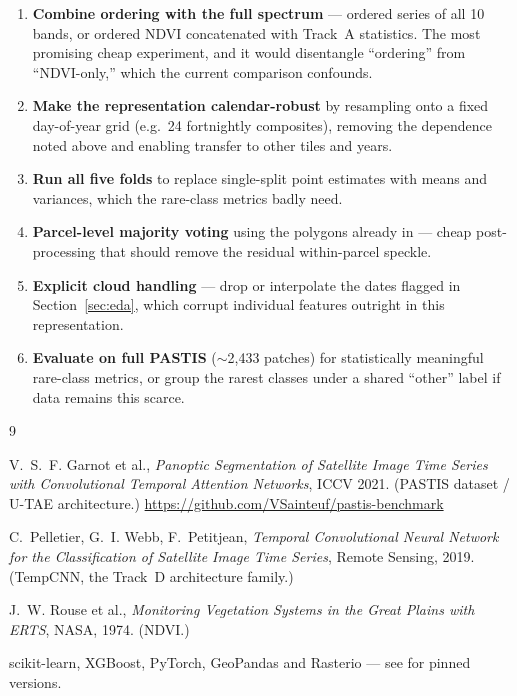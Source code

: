 \documentclass[11pt,a4paper]{article}
\newcommand{\file}[1]{\texttt{\detokenize{#1}}}
\begin{document}
\begin{enumerate}[leftmargin=*]
  \item \textbf{Combine ordering with the full spectrum} --- ordered series of
        all 10 bands, or ordered NDVI concatenated with Track~A statistics. The
        most promising cheap experiment, and it would disentangle ``ordering''
        from ``NDVI-only,'' which the current comparison confounds.
  \item \textbf{Make the representation calendar-robust} by resampling onto a
        fixed day-of-year grid (e.g.\ 24 fortnightly composites), removing the
        dependence noted above and enabling transfer to other tiles and years.
  \item \textbf{Run all five folds} to replace single-split point estimates with
        means and variances, which the rare-class metrics badly need.
  \item \textbf{Parcel-level majority voting} using the polygons already in
        \file{metadata.geojson} --- cheap post-processing that should remove the
        residual within-parcel speckle.
  \item \textbf{Explicit cloud handling} --- drop or interpolate the dates
        flagged in Section~\ref{sec:eda}, which corrupt individual features
        outright in this representation.
  \item \textbf{Evaluate on full PASTIS} ($\sim$2{,}433 patches) for
        statistically meaningful rare-class metrics, or group the rarest classes
        under a shared ``other'' label if data remains this scarce.
\end{enumerate}

\begin{thebibliography}{9}

V.~S.~F. Garnot et al.,
\emph{Panoptic Segmentation of Satellite Image Time Series with Convolutional
Temporal Attention Networks}, ICCV 2021. (PASTIS dataset / U-TAE architecture.)
\url{https://github.com/VSainteuf/pastis-benchmark}

C.~Pelletier, G.~I. Webb, F.~Petitjean,
\emph{Temporal Convolutional Neural Network for the Classification of Satellite
Image Time Series}, Remote Sensing, 2019. (TempCNN, the Track~D architecture
family.)

J.~W. Rouse et al.,
\emph{Monitoring Vegetation Systems in the Great Plains with ERTS}, NASA, 1974.
(NDVI.)

scikit-learn, XGBoost, PyTorch, GeoPandas and Rasterio --- see
\file{requirements.txt} for pinned versions.

\end{thebibliography}
\end{document}
